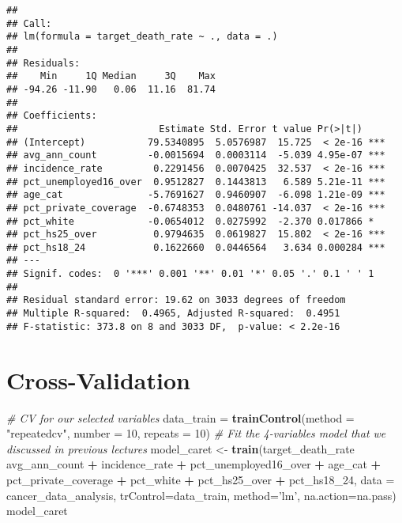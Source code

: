 \documentclass[]{article}
\newenvironment{Shaded}{\begin{snugshade}}{\end{snugshade}}
\newcommand{\KeywordTok}[1]{\textcolor[rgb]{0.13,0.29,0.53}{\textbf{#1}}}
\newcommand{\DataTypeTok}[1]{\textcolor[rgb]{0.13,0.29,0.53}{#1}}
\newcommand{\DecValTok}[1]{\textcolor[rgb]{0.00,0.00,0.81}{#1}}
\newcommand{\StringTok}[1]{\textcolor[rgb]{0.31,0.60,0.02}{#1}}
\newcommand{\CommentTok}[1]{\textcolor[rgb]{0.56,0.35,0.01}{\textit{#1}}}
\newcommand{\OperatorTok}[1]{\textcolor[rgb]{0.81,0.36,0.00}{\textbf{#1}}}
\newcommand{\NormalTok}[1]{#1}
\begin{document}
\begin{verbatim}
## 
## Call:
## lm(formula = target_death_rate ~ ., data = .)
## 
## Residuals:
##    Min     1Q Median     3Q    Max 
## -94.26 -11.90   0.06  11.16  81.74 
## 
## Coefficients:
##                         Estimate Std. Error t value Pr(>|t|)    
## (Intercept)           79.5340895  5.0576987  15.725  < 2e-16 ***
## avg_ann_count         -0.0015694  0.0003114  -5.039 4.95e-07 ***
## incidence_rate         0.2291456  0.0070425  32.537  < 2e-16 ***
## pct_unemployed16_over  0.9512827  0.1443813   6.589 5.21e-11 ***
## age_cat               -5.7691627  0.9460907  -6.098 1.21e-09 ***
## pct_private_coverage  -0.6748353  0.0480761 -14.037  < 2e-16 ***
## pct_white             -0.0654012  0.0275992  -2.370 0.017866 *  
## pct_hs25_over          0.9794635  0.0619827  15.802  < 2e-16 ***
## pct_hs18_24            0.1622660  0.0446564   3.634 0.000284 ***
## ---
## Signif. codes:  0 '***' 0.001 '**' 0.01 '*' 0.05 '.' 0.1 ' ' 1
## 
## Residual standard error: 19.62 on 3033 degrees of freedom
## Multiple R-squared:  0.4965, Adjusted R-squared:  0.4951 
## F-statistic: 373.8 on 8 and 3033 DF,  p-value: < 2.2e-16
\end{verbatim}

\section{Cross-Validation}\label{cross-validation}

\begin{Shaded}
\begin{Highlighting}[]
\CommentTok{# CV for our selected variables}
\NormalTok{data_train =}\StringTok{ }\KeywordTok{trainControl}\NormalTok{(}\DataTypeTok{method =} \StringTok{"repeatedcv"}\NormalTok{, }\DataTypeTok{number =} \DecValTok{10}\NormalTok{, }\DataTypeTok{repeats =} \DecValTok{10}\NormalTok{)}
\CommentTok{# Fit the 4-variables model that we discussed in previous lectures}
\NormalTok{model_caret <-}\StringTok{ }\KeywordTok{train}\NormalTok{(target_death_rate }\OperatorTok{~}\StringTok{ }\NormalTok{avg_ann_count }\OperatorTok{+}\StringTok{ }\NormalTok{incidence_rate }\OperatorTok{+}\StringTok{ }\NormalTok{pct_unemployed16_over }\OperatorTok{+}\StringTok{ }\NormalTok{age_cat }\OperatorTok{+}\StringTok{ }\NormalTok{pct_private_coverage }\OperatorTok{+}\StringTok{ }\NormalTok{pct_white }\OperatorTok{+}\StringTok{ }\NormalTok{pct_hs25_over }\OperatorTok{+}\StringTok{ }\NormalTok{pct_hs18_}\DecValTok{24}\NormalTok{, }\DataTypeTok{data =}\NormalTok{ cancer_data_analysis,}
                   \DataTypeTok{trControl=}\NormalTok{data_train,}
                   \DataTypeTok{method=}\StringTok{'lm'}\NormalTok{,}
                   \DataTypeTok{na.action=}\NormalTok{na.pass)}
\NormalTok{model_caret}
\end{Highlighting}
\end{Shaded}
\end{document}
